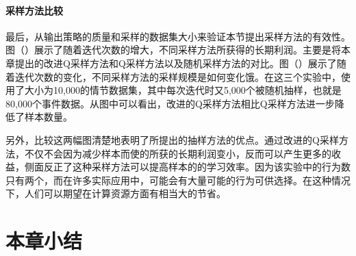 \paragraph{采样方法比较}
最后，从输出策略的质量和采样的数据集大小来验证本节提出采样方法的有效性。图（）展示了随着迭代次数的增大，不同采样方法所获得的长期利润。主要是将本章提出的改进Q采样方法和Q采样方法以及随机采样方法的对比。图（）展示了随着迭代次数的变化，不同采样方法的采样规模是如何变化饿。在这三个实验中，使用了大小为10,000的情节数据集，其中每次迭代时又5,000个被随机抽样，也就是80,000个事件数据。从图中可以看出，改进的Q采样方法相比Q采样方法进一步降低了样本数量。

另外，比较这两幅图清楚地表明了所提出的抽样方法的优点。通过改进的Q采样方法，不仅不会因为减少样本而使的所获的长期利润变小，反而可以产生更多的收益，侧面反正了这种采样方法可以提高样本的的学习效率。因为该实验中的行为数只有两个，而在许多实际应用中，可能会有大量可能的行为可供选择。在这种情况下，人们可以期望在计算资源方面有相当大的节省。

\section{本章小结}
